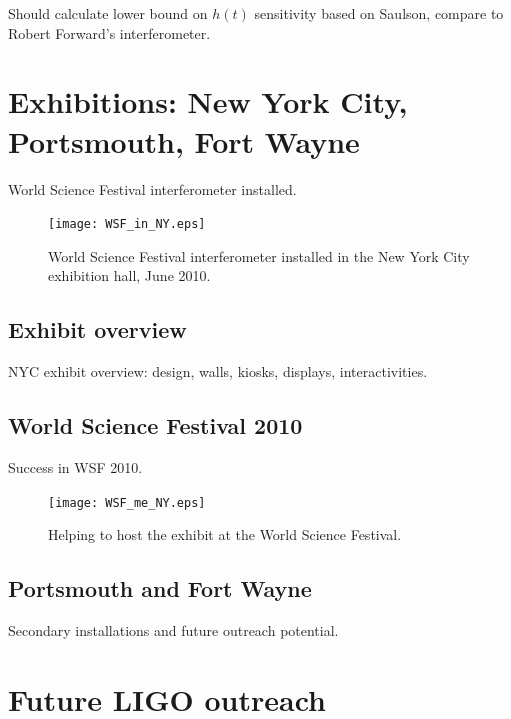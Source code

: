 Should calculate lower bound on $h(t)$ sensitivity based on Saulson, compare to Robert Forward's interferometer.


    \section{Exhibitions: New York City, Portsmouth, Fort Wayne}
    \label{exhibitions}

        World Science Festival interferometer installed.

	\begin{figure}
	\begin{center}
	\texttt{[image: WSF\_in\_NY.eps]}
	\caption{World Science Festival interferometer installed in the New York City exhibition hall, June 2010.}
	\label{WSF_IFO_photo}
	\end{center}
	\end{figure}


        \subsection{Exhibit overview}
        \label{exhibit_overview}

            NYC exhibit overview: design, walls, kiosks, displays, interactivities.

        \subsection{World Science Festival 2010}
        \label{WSF2010}

            Success in WSF 2010.

	\begin{figure}
	\begin{center}
	\texttt{[image: WSF\_me\_NY.eps]}
	\caption{Helping to host the exhibit at the World Science Festival.}
	\label{WSF_IFO_me}
	\end{center}
	\end{figure}


        \subsection{Portsmouth and Fort Wayne}
        \label{secondary_installations}

            Secondary installations and future outreach potential.

    \section{Future LIGO outreach}
    \label{future_outreach}

